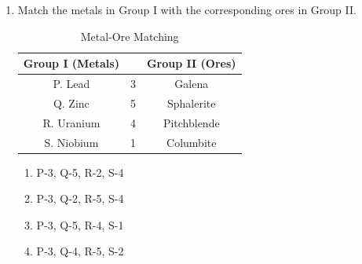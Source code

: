 \documentclass[12pt]{article}
\begin{document}
\begin{enumerate}
\item Match the metals in Group I with the corresponding ores in Group II.
\begin{table}[h]
\centering
\caption{Metal-Ore Matching}
\begin{tabular}{|c|c|c|}
\hline
\textbf{Group I (Metals)} & & \textbf{Group II (Ores)} \\
\hline
P. Lead & 3 & Galena \\
Q. Zinc & 5 & Sphalerite \\
R. Uranium & 4 & Pitchblende \\
S. Niobium & 1 & Columbite \\
\hline
\end{tabular}
\end{table}
\begin{enumerate}[label=(\Alph*)]
    \item P-3, Q-5, R-2, S-4
    \item P-3, Q-2, R-5, S-4
    \item P-3, Q-5, R-4, S-1
    \item P-3, Q-4, R-5, S-2
\end{enumerate}


\end{enumerate}
\end{document}

